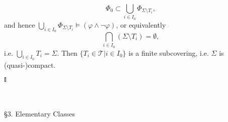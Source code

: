 \begin{enumerate}[1.]
\begin{enumerate}[(a)]
\[
\Phi_0 \subset \bigcup_{i \in I_0} \Phi_{\Sigma \setminus T_i},
\]
and hence $\bigcup_{i \in I_0} \Phi_{\Sigma \setminus T_i} \models (\varphi \land \neg \varphi)$, or equivalently
\[
\bigcap_{i \in I_0} (\Sigma \setminus T_i) = \emptyset,
\]
i.e. $\bigcup_{i \in I_0} T_i = \Sigma$. Then $\{ T_i \in \mathcal{T} | i \in I_0 \}$ is a finite subcovering, i.e. $\Sigma$ is (quasi-)compact. \begin{flushright}$\talloblong$\end{flushright}
\end{enumerate}
\end{enumerate}
\ 
\\
\\
{\large \S3. Elementary Classes}
